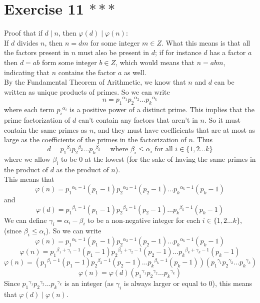 \documentclass[12pt]{article}
\begin{document}
    \section*{Exercise 11 $***$}
    Proof that if $d \mid n$,
    then $\varphi(d) \mid \varphi(n)$: \\
    If $d$ divides $n$,
    then $n = dm$ for some integer $m \in Z$.
    What this means is that all the factors present in $n$
    must also be present in $d$;
    if for instance $d$ has a factor $a$
    then $d = ab$ form some integer $b \in Z$,
    which would means that $n = abm$,
    indicating that $n$ contains the factor $a$ as well. \\
    By the Fundamental Theorem of Arithmetic,
    we know that $n$ and $d$ can be written
    as unique products of primes.
    So we can write
    \[ n = {p_1}^{\alpha_1}{p_2}^{\alpha_2}\dots{p_k}^{\alpha_k} \]
    where each term ${p_i}^{\alpha_i}$
    is a positive power of a distinct prime.
    This implies that the prime factorization of $d$
    can't contain any factors that aren't in $n$.
    So it must contain the same primes as $n$,
    and they must have coefficients that are at most
    as large as the coefficients of the primes
    in the factorization of $n$.
    Thus
    \[ d = {p_1}^{\beta_1}{p_2}^{\beta_2}\dots{p_k}^{\beta_k}
    \quad \text{ where } \beta_i \leqslant \alpha_i
    \text{ for all } i \in \{1, 2\dots k\} \]
    where we allow $\beta_i$ to be $0$ at the lowest
    (for the sake of having the same primes in the product of $d$
    as the product of $n$). \\
    This means that
    \[ \varphi(n) = 
    {p_1}^{\alpha_1 - 1}(p_1 - 1){p_2}^{\alpha_2 - 1}(p_2 - 1)
    \dots {p_k}^{\alpha_k - 1}(p_k - 1) \]
    and
    \[ \varphi(d) = 
    {p_1}^{\beta_1 - 1}(p_1 - 1){p_2}^{\beta_2 - 1}(p_2 - 1)
    \dots {p_k}^{\beta_k - 1}(p_k - 1) \]
    We can define $\gamma_i = \alpha_i - \beta_i$
    to be a non-negative integer for each $i \in \{1, 2\dots k\}$,
    (since $\beta_i \leqslant \alpha_i$).
    So we can write
    \[ \varphi(n) = 
    {p_1}^{\alpha_1 - 1}(p_1 - 1){p_2}^{\alpha_2 - 1}(p_2 - 1)
    \dots {p_k}^{\alpha_k - 1}(p_k - 1) \]
    \[ \varphi(n) = {p_1}^{\beta_1 + \gamma_1 - 1}(p_1 - 1)
    {p_2}^{\beta_2 + \gamma_2 - 1}(p_2 - 1)
    \dots {p_k}^{\beta_k + \gamma_k - 1}(p_k - 1) \]
    \[ \varphi(n) = ({p_1}^{\beta_1 - 1}(p_1 - 1)
    {p_2}^{\beta_2 - 1}(p_2 - 1)
    \dots {p_k}^{\beta_k - 1}(p_k - 1))
    ({p_1}^{\gamma_1}{p_2}^{\gamma_2}\dots {p_k}^{\gamma_k}) \]
    \[ \varphi(n) = \varphi(d)
    ({p_1}^{\gamma_1}{p_2}^{\gamma_2}\dots {p_k}^{\gamma_k}) \]
    Since ${p_1}^{\gamma_1}{p_2}^{\gamma_2}\dots {p_k}^{\gamma_k}$
    is an integer
    (as $\gamma_i$ is always larger or equal to $0$),
    this means that $\varphi(d) \mid \varphi(n)$. \\
\end{document}

